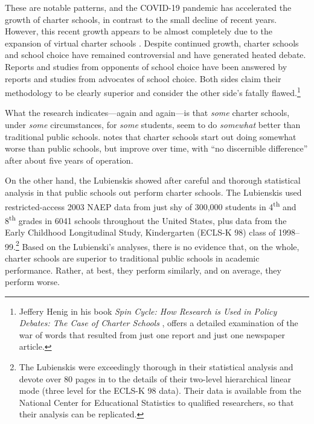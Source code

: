 These are notable patterns, and the COVID-19 pandemic has accelerated the growth of charter schools, in contrast to the small decline of recent years. However, this recent growth appears to be almost completely due to the expansion of virtual charter schools \parencite{Strauss2021}. Despite continued growth, charter schools and school choice have remained controversial and have generated heated debate. Reports and studies from opponents of school choice have been answered by reports and studies from advocates of school choice. Both sides claim their methodology to be clearly superior and consider the other side's fatally flawed.\footnote{Jeffery Henig in his book \textit{Spin Cycle: How Research is Used in Policy Debates: The Case of Charter Schools} \parencite{Henig2009}, offers a detailed examination of the war of words that resulted from just one report and just one newspaper article.}

What the research indicates—again and again—is that \textit{some} charter schools, under \textit{some} circumstances, for \textit{some} students, seem to do \textit{somewhat} better than traditional public schools. \citeauthor{Garcia2018} notes that charter schools start out doing somewhat worse than public schools, but improve over time, with ``no discernible difference'' \parencite[119]{Garcia2018} after about five years of operation.

On the other hand, the Lubienskis showed after careful and thorough statistical analysis in \textcite{Lubienski.Lubienski2014} that public schools out perform charter schools. The Lubienskis used restricted-access 2003 NAEP data from just shy of 300,000 students in 4\textsuperscript{th} and 8\textsuperscript{th} grades in 6041 schools throughout the United States, plus data from the Early Childhood Longitudinal Study, Kindergarten (ECLS-K 98) class of 1998–99.\footnote{The Lubienskis were exceedingly thorough in their statistical analysis and devote over 80 pages in \textcite{Lubienski.Lubienski2014} to the details of their two-level hierarchical linear mode (three level for the ECLS-K 98 data). Their data is available from the National Center for Educational Statistics to qualified researchers, so that their analysis can be replicated.} Based on the Lubienski’s analyses, there is no evidence that, on the whole, charter schools are superior to traditional public schools in academic performance. Rather, at best, they perform similarly, and on average, they perform worse.

